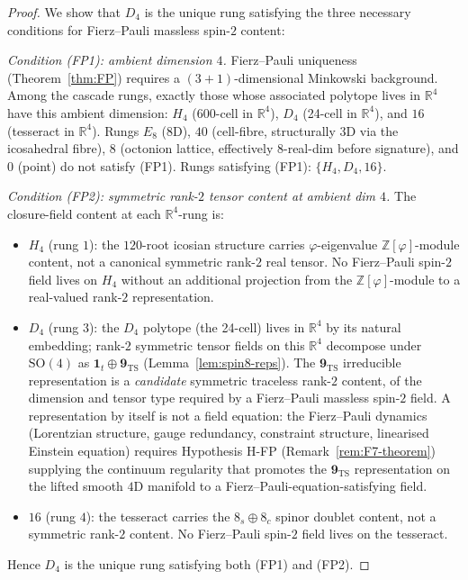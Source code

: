 \documentclass[12pt]{article}
\theoremstyle{definition}
\theoremstyle{remark}
\newcommand{\Zphi}{\mathbb{Z}[\varphi]}
\begin{document}
\begin{proof}
We show that $D_4$ is the unique rung satisfying the three necessary conditions for Fierz--Pauli massless spin-$2$ content:

\emph{Condition (FP1): ambient dimension $4$.} Fierz--Pauli uniqueness (Theorem~\ref{thm:FP}) requires a $(3+1)$-dimensional Minkowski background. Among the cascade rungs, exactly those whose associated polytope lives in $\mathbb{R}^4$ have this ambient dimension: $H_4$ (600-cell in $\mathbb{R}^4$), $D_4$ (24-cell in $\mathbb{R}^4$), and $16$ (tesseract in $\mathbb{R}^4$). Rungs $E_8$ (8D), $40$ (cell-fibre, structurally 3D via the icosahedral fibre), $8$ (octonion lattice, effectively 8-real-dim before signature), and $0$ (point) do not satisfy (FP1). Rungs satisfying (FP1): $\{H_4, D_4, 16\}$.

\emph{Condition (FP2): symmetric rank-$2$ tensor content at ambient dim $4$.} The closure-field content at each $\mathbb{R}^4$-rung is:
\begin{itemize}
\item $H_4$ (rung $1$): the $120$-root icosian structure carries $\varphi$-eigenvalue $\Zphi$-module content, not a canonical symmetric rank-$2$ real tensor. No Fierz--Pauli spin-$2$ field lives on $H_4$ without an additional projection from the $\Zphi$-module to a real-valued rank-$2$ representation.
\item $D_4$ (rung $3$): the $D_4$ polytope (the 24-cell) lives in $\mathbb{R}^4$ by its natural embedding; rank-$2$ symmetric tensor fields on this $\mathbb{R}^4$ decompose under $\mathrm{SO}(4)$ as $\mathbf{1}_t \oplus \mathbf{9}_{\mathrm{TS}}$ (Lemma~\ref{lem:spin8-reps}). The $\mathbf{9}_{\mathrm{TS}}$ irreducible representation is a \emph{candidate} symmetric traceless rank-$2$ content, of the dimension and tensor type required by a Fierz--Pauli massless spin-$2$ field. A representation by itself is not a field equation: the Fierz--Pauli dynamics (Lorentzian structure, gauge redundancy, constraint structure, linearised Einstein equation) requires Hypothesis H-FP (Remark~\ref{rem:F7-theorem}) supplying the continuum regularity that promotes the $\mathbf{9}_{\mathrm{TS}}$ representation on the lifted smooth $4$D manifold to a Fierz--Pauli-equation-satisfying field.
\item $16$ (rung $4$): the tesseract carries the $8_s \oplus 8_c$ spinor doublet content, not a symmetric rank-$2$ content. No Fierz--Pauli spin-$2$ field lives on the tesseract.
\end{itemize}
Hence $D_4$ is the unique rung satisfying both (FP1) and (FP2).


\end{proof}
\end{document}
